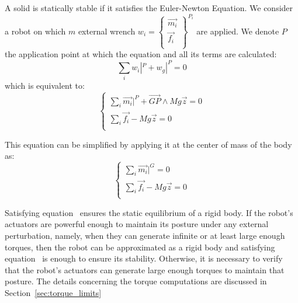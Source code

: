 A solid is statically stable if it satisfies the Euler-Newton Equation.
We consider a robot on which $m$ external wrench $w_i = \left\{ \begin{array}{r}
    \vec{m_i}\\
    \vec{f_i}\\
\end{array} \right\}^{P_i}$ are applied.
We denote $P$ the application point at which the equation and all its terms are calculated:
\begin{equation}
  \sum\limits_i w_i|^P + w_g|^P = 0
\end{equation}
which is equivalent to:
\begin{equation}
\left\{
\begin{array}{r}
  \sum\limits_i \vec{m_i}|^P + \overrightarrow{GP}\wedge Mg\vec{z} = 0 \\
  \sum\limits_i \vec{f_i} - Mg\vec{z} = 0 \\
\end{array}
\right.
\end{equation}

This equation can be simplified by applying it at the center of mass of the body as:
\begin{equation}
  \left\{
  \begin{array}{r}
    \sum\limits_i \vec{m_i}|^G = 0 \\
    \sum\limits_i \vec{f_i} - Mg\vec{z} = 0 \\
  \end{array}
  \right.
\label{eq:stability}
\end{equation}

Satisfying equation~ ensures the static equilibrium of a rigid body.
If the robot's actuators are powerful enough to maintain its posture under any external perturbation, namely, when they can generate infinite or at least large enough torques, then the robot can be approximated as a rigid body and satisfying equation~ is enough to ensure its stability.
Otherwise, it is necessary to verify that the robot's actuators can generate large enough torques to maintain that posture.
The details concerning the torque computations are discussed in Section~\ref{sec:torque_limits}

